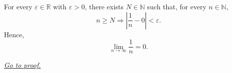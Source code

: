 \begin{corollary}
\label{cor:archimedean-reciprocal}
For every $\varepsilon\in\mathbb{R}$ with $\varepsilon>0$, there exists
$N\in\mathbb{N}$ such that, for every $n\in\mathbb{N}$,
\[
  n\geq N
  \Longrightarrow
  \left|\frac{1}{n}-0\right|<\varepsilon.
\]
Hence,
\[
  \lim_{n\longrightarrow\infty}\frac{1}{n}=0.
\]

\smallskip
\noindent
\hyperref[prf:archimedean-reciprocal]{\textit{Go to proof.}}
\end{corollary}